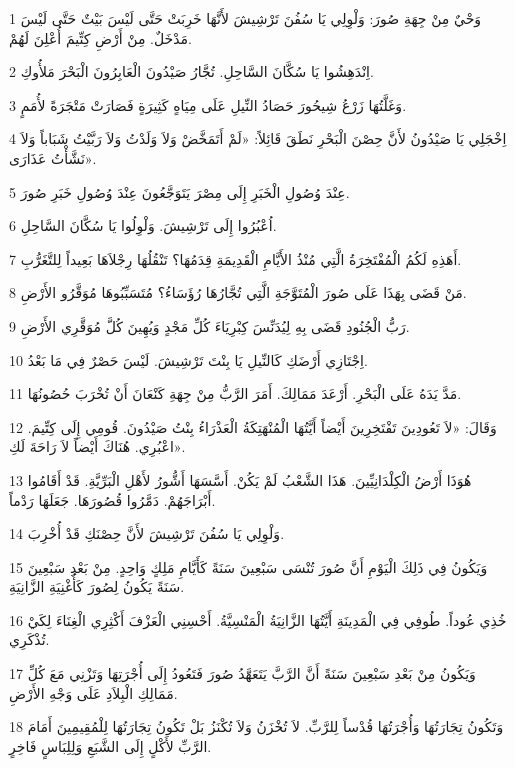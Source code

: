\par 1 وَحْيٌ مِنْ جِهَةِ صُورَ: وَلْوِلِي يَا سُفُنَ تَرْشِيشَ لأَنَّهَا خَرِبَتْ حَتَّى لَيْسَ بَيْتٌ حَتَّى لَيْسَ مَدْخَلٌ. مِنْ أَرْضِ كِتِّيمَ أُعْلِنَ لَهُمْ.
\par 2 اِنْدَهِشُوا يَا سُكَّانَ السَّاحِلِ. تُجَّارُ صَيْدُونَ الْعَابِرُونَ الْبَحْرَ مَلأُوكِ.
\par 3 وَغَلَّتُهَا زَرْعُ شِيحُورَ حَصَادُ النِّيلِ عَلَى مِيَاهٍ كَثِيرَةٍ فَصَارَتْ مَتْجَرَةً لأُمَمٍ.
\par 4 اِخْجَلِي يَا صَيْدُونُ لأَنَّ حِصْنَ الْبَحْرِ نَطَقَ قَائِلاً: «لَمْ أَتَمَخَّضْ وَلاَ وَلَدْتُ وَلاَ رَبَّيْتُ شَبَاباً وَلاَ نَشَّأْتُ عَذَارَى».
\par 5 عِنْدَ وُصُولِ الْخَبَرِ إِلَى مِصْرَ يَتَوَجَّعُونَ عِنْدَ وُصُولِ خَبَرِ صُورَ.
\par 6 اُعْبُرُوا إِلَى تَرْشِيشَ. وَلْوِلُوا يَا سُكَّانَ السَّاحِلِ.
\par 7 أَهَذِهِ لَكُمُ الْمُفْتَخِرَةُ الَّتِي مُنْذُ الأَيَّامِ الْقَدِيمَةِ قِدَمُهَا؟ تَنْقُلُهَا رِجْلاَهَا بَعِيداً لِلتَّغَرُّبِ.
\par 8 مَنْ قَضَى بِهَذَا عَلَى صُورَ الْمُتَوَّجَةِ الَّتِي تُجَّارُهَا رُؤَسَاءُ؟ مُتَسَبِّبُوهَا مُوَقَّرُو الأَرْضِ.
\par 9 رَبُّ الْجُنُودِ قَضَى بِهِ لِيُدَنِّسَ كِبْرِيَاءَ كُلِّ مَجْدٍ وَيُهِينَ كُلَّ مُوَقَّرِي الأَرْضِ.
\par 10 اِجْتَازِي أَرْضَكِ كَالنِّيلِ يَا بِنْتَ تَرْشِيشَ. لَيْسَ حَصْرٌ فِي مَا بَعْدُ.
\par 11 مَدَّ يَدَهُ عَلَى الْبَحْرِ. أَرْعَدَ مَمَالِكَ. أَمَرَ الرَّبُّ مِنْ جِهَةِ كَنْعَانَ أَنْ تُخْرَبَ حُصُونُهَا.
\par 12 وَقَالَ: «لاَ تَعُودِينَ تَفْتَخِرِينَ أَيْضاً أَيَّتُهَا الْمُنْهَتِكَةُ الْعَذْرَاءُ بِنْتُ صَيْدُونَ. قُومِي إِلَى كِتِّيمَ. اعْبُرِي. هُنَاكَ أَيْضاً لاَ رَاحَةَ لَكِ».
\par 13 هُوَذَا أَرْضُ الْكِلْدَانِيِّينَ. هَذَا الشَّعْبُ لَمْ يَكُنْ. أَسَّسَهَا أَشُّورُ لأَهْلِ الْبَرِّيَّةِ. قَدْ أَقَامُوا أَبْرَاجَهُمْ. دَمَّرُوا قُصُورَهَا. جَعَلَهَا رَدْماً.
\par 14 وَلْوِلِي يَا سُفُنَ تَرْشِيشَ لأَنَّ حِصْنَكِ قَدْ أُخْرِبَ.
\par 15 وَيَكُونُ فِي ذَلِكَ الْيَوْمِ أَنَّ صُورَ تُنْسَى سَبْعِينَ سَنَةً كَأَيَّامِ مَلِكٍ وَاحِدٍ. مِنْ بَعْدِ سَبْعِينَ سَنَةً يَكُونُ لِصُورَ كَأُغْنِيَةِ الزَّانِيَةِ.
\par 16 خُذِي عُوداً. طُوفِي فِي الْمَدِينَةِ أَيَّتُهَا الزَّانِيَةُ الْمَنْسِيَّةُ. أَحْسِنِي الْعَزْفَ أَكْثِرِي الْغِنَاءَ لِكَيْ تُذْكَرِي.
\par 17 وَيَكُونُ مِنْ بَعْدِ سَبْعِينَ سَنَةً أَنَّ الرَّبَّ يَتَعَهَّدُ صُورَ فَتَعُودُ إِلَى أُجْرَتِهَا وَتَزْنِي مَعَ كُلِّ مَمَالِكِ الْبِلاَدِ عَلَى وَجْهِ الأَرْضِ.
\par 18 وَتَكُونُ تِجَارَتُهَا وَأُجْرَتُهَا قُدْساً لِلرَّبِّ. لاَ تُخْزَنُ وَلاَ تُكْنَزُ بَلْ تَكُونُ تِجَارَتُهَا لِلْمُقِيمِينَ أَمَامَ الرَّبِّ لأَكْلٍ إِلَى الشَّبَعِ وَلِلِبَاسٍ فَاخِرٍ.

